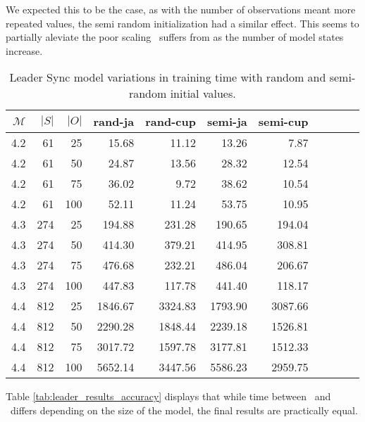 We expected this to be the case, as with the number of observations meant more repeated values, the semi random initialization had a similar effect.
This seems to partially aleviate the poor scaling \Cupaal\ suffers from as the number of model states increase.



\begin{table}[htb!]
    \centering
    \caption{Leader Sync model variations in training time with random and semi-random initial values.}
    \label{tab:leader_results_rand_vs_semi}
    \begin{tabular}{rrrrrrrrrrr}
        \toprule
        $\mathcal{M}$ & $|S|$ & $|O|$ & rand-ja & rand-cup & semi-ja & semi-cup \\
        \midrule
        4.2           & 61    & 25    & 15.68   & 11.12    & 13.26   & 7.87     \\
        4.2           & 61    & 50    & 24.87   & 13.56    & 28.32   & 12.54    \\
        4.2           & 61    & 75    & 36.02   & 9.72     & 38.62   & 10.54    \\
        4.2           & 61    & 100   & 52.11   & 11.24    & 53.75   & 10.95    \\
        4.3           & 274   & 25    & 194.88  & 231.28   & 190.65  & 194.04   \\
        4.3           & 274   & 50    & 414.30  & 379.21   & 414.95  & 308.81   \\
        4.3           & 274   & 75    & 476.68  & 232.21   & 486.04  & 206.67   \\
        4.3           & 274   & 100   & 447.83  & 117.78   & 441.40  & 118.17   \\
        4.4           & 812   & 25    & 1846.67 & 3324.83  & 1793.90 & 3087.66  \\
        4.4           & 812   & 50    & 2290.28 & 1848.44  & 2239.18 & 1526.81  \\
        4.4           & 812   & 75    & 3017.72 & 1597.78  & 3177.81 & 1512.33  \\
        4.4           & 812   & 100   & 5652.14 & 3447.56  & 5586.23 & 2959.75  \\
        \bottomrule
    \end{tabular}
\end{table}


Table \autoref{tab:leader_results_accuracy} displays that while time between \Cupaal\ and \Jajapy\ differs depending on the size of the model, the final results are practically equal.

